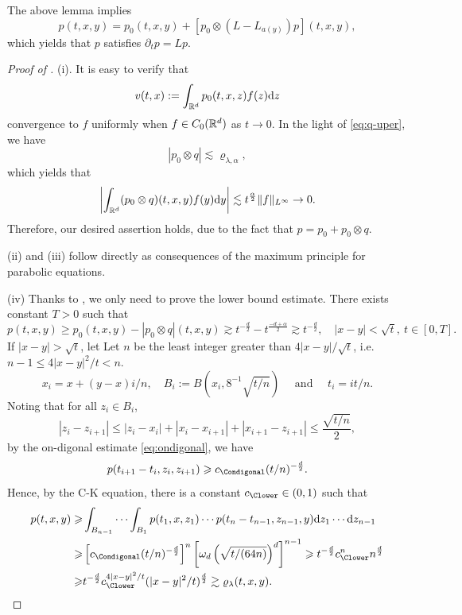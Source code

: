 The above lemma implies 
\[
    p(t,x,y)=p_0(t,x,y)+[p_0\otimes (L-L_{a(y)})p](t,x,y),  
\]
which yields that \(p\) satisfies \(\partial_t p= L p\). 

\begin{proof}[Proof of ]
    (i). It is easy to verify that 
    \[
    v(t,x):=\int_{{\mathbb R}^d}p_0(t,x,z)f(z) \text{\rm{d}} z
    \]
    convergence to \(f\) uniformly when \(f\in C_0({\mathbb R}^d)\) as \(t\to0\). In the light of \eqref{eq:q-uper}, we have 
    \begin{equation}\label{eq:pOq}
        |p_0\otimes q|\lesssim \varrho_{\lambda, \alpha}, 
    \end{equation} 
    which yields that 
    \[
    \left| \int_{{\mathbb R}^d}(p_0\otimes q)(t,x,y)f(y) \text{\rm{d}} y \right|\lesssim t^{\frac{\alpha}{2}} \|f\|_{L^\infty}\to 0. 
    \]
    Therefore, our desired assertion holds, due to the fact that \(p=p_0+p_0\otimes q\). 

    (ii) and (iii) follow directly as consequences of the maximum principle for parabolic equations. 

    (iv) Thanks to , we only need to prove the lower bound estimate. There exists constant \(T>0\) such that
    \begin{equation}\label{eq:ondigonal}
        p(t,x,y) \geq  p_0(t,x,y) - |p_0\otimes q|(t,x,y)\gtrsim  t^{-\frac{d}{2}}-t^{\frac{-d+\alpha}{2}}\gtrsim t^{-\frac{d}{2}}, \quad |x-y|<\sqrt{t},~ t\in [0,T].
    \end{equation}
    If \(|x-y|>\sqrt{t}\), let Let \(n\) be the least integer greater than \(4|x-y|/\sqrt{t}\), i.e. 
    \(n-1\leq 4|x-y|^2/t<n\). 
    \[
    x_i=x+{(y-x)i}/{n}, \quad B_i:=B\left(x_i, 8^{-1}\sqrt{t/n} \right) \quad \text { and } \quad t_i= i t / n.
    \]
    Noting that for all \(z_i\in B_i\), 
    \[
    \left|z_i-z_{i+1}\right| \leqslant\left|z_i-x_i\right|+\left|x_i-x_{i+1}\right|+\left|x_{i+1}-z_{i+1}\right| \leq \frac{\sqrt{t/n}}{2},
    \]
    by the on-digonal estimate \eqref{eq:ondigonal}, we have  \const{\Condigonal} \const{\Clower}
    \[
    p(t_{i+1}-t_i, z_{i}, z_{i+1}) \geq c_{\Condigonal} (t/n)^{-\frac{d}{2}}. 
    \]
    Hence, by the C-K equation, there is a constant \(c_{\Clower}\in (0,1)\) such that 
    \begin{align*}
        p(t,x,y)\geq& \int_{B_{n-1}}\cdots\int_{B_1} p(t_1,x,z_1)\cdots p(t_{n}-t_{n-1},z_{n-1}, y) \d z_1\cdots\d z_{n-1}\\
        \geq & \l[ c_{\Condigonal} (t/n)^{-\frac{d}{2}} \r]^n \l[\omega_d \l(\sqrt{t/(64n)}\r)^d\r]^{n-1}\geq t^{-\frac{d}{2}} c_{\Clower}^n n^{\frac{d}{2}}\\
        \geq & t^{-\frac{d}{2}} c_{\Clower}^{4|x-y|^2/t} (|x-y|^2/t)^{\frac{d}{2}} \gtrsim \varrho_{\lambda}(t,x,y). 
    \end{align*}
\end{proof}
